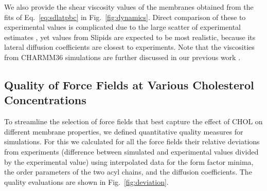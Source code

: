 \documentclass[journal=jctcce]{achemso}
\begin{document}
We also provide the shear viscosity values of the membranes obtained from the fits of Eq.~\eqref{eq:sdlatpbc} in Fig.~\ref{fig:dynamics}. Direct comparison of these to experimental values is complicated due to the large scatter of experimental estimates \cite{faizi2022vesicle}, yet values from Slipids are expected to be  most realistic, because its lateral diffusion coefficients are closest to experiments. Note that the viscosities from CHARMM36 simulations are further  discussed in our previous work \cite{fabian2023protein}.

\subsection{Quality of Force Fields at Various Cholesterol Concentrations}

To streamline the selection of force fields that best capture the effect of CHOL on different membrane properties, we defined  quantitative quality measures for simulations. For this we calculated for all the force fields their relative deviations from experiments (difference between simulated and experimental values divided by the experimental value) using interpolated data for the form factor minima, the order parameters of the two acyl chains, and the diffusion coefficients. The quality evaluations are shown in Fig.~\ref{fig:deviation}.
\end{document}
